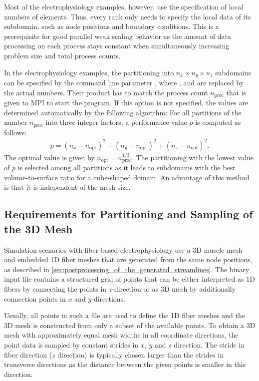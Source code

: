 Most of the electrophysiology examples, however, use the specification of local numbers of elements. Thus, every rank only needs to specify the local data of its subdomain, such as node positions and boundary conditions. This is a prerequisite for good parallel weak scaling behavior as the amount of data processing on each process stays constant when simultaneously increasing problem size and total process counts.

In the electrophysiology examples, the partitioning into $n_x \times n_y \times n_z$ subdomains can be specified by the command line parameter , where ,  and  are replaced by the actual numbers. Their product has to match the process count $n_\text{proc}$ that is given to MPI to start the program.
If this option is not specified, the values are determined automatically by the following algorithm: For all partitions of the number $n_\text{proc}$ into three integer factors, a performance value $p$ is computed as follows:
%
\begin{align*}
  p = (n_x-n_\text{opt})^2 + (n_y-n_\text{opt})^2 + (n_z-n_\text{opt})^2.
\end{align*}
The optimal value is given by $n_\text{opt} = n_\text{proc}^{1/3}$. The partitioning with the lowest value of $p$ is selected among all partitions as it leads to subdomains with the best volume-to-surface ratio for a cube-shaped domain. An advantage of this method is that it is independent of the mesh size.

\subsection{Requirements for Partitioning and Sampling of the 3D Mesh}\label{sec:partitioning_requirements}

Simulation scenarios with fiber-based electrophysiology use a 3D muscle mesh and embedded 1D fiber meshes that are generated from the same node positions, as described in \cref{sec:postprocessing_of_the_generated_streamlines}. The binary input file contains a structured grid of points that can be either interpreted as 1D fibers by connecting the points in $z$-direction or as 3D mesh by additionally connection points in $x$ and $y$-directions.

Usually, all points in such a file are used to define the 1D fiber meshes and the 3D mesh is constructed from only a subset of the available points. To obtain a 3D mesh with approximately equal mesh widths in all coordinate directions, the point data is sampled by constant strides in $x$, $y$ and $z$ direction.  The stride in fiber direction ($z$ direction) is typically chosen larger than the strides in transverse directions as the distance between the given points is smaller in this direction.

